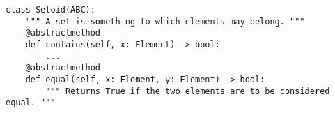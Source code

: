 \begin{verbatim}
class Setoid(ABC):
    """ A set is something to which elements may belong. """
    @abstractmethod
    def contains(self, x: Element) -> bool:
        ...
    @abstractmethod
    def equal(self, x: Element, y: Element) -> bool:
        """ Returns True if the two elements are to be considered equal. """
\end{verbatim}